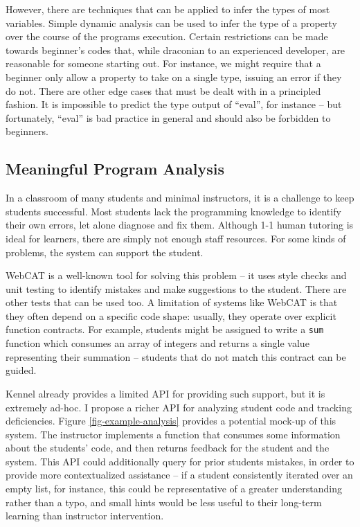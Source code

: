 However, there are techniques that can be applied to infer the types of most variables.
Simple dynamic analysis can be used to infer the type of a property over the course of the programs execution.
Certain restrictions can be made towards beginner's codes that, while draconian to an experienced developer, are reasonable for someone starting out.
For instance, we might require that a beginner only allow a property to take on a single type, issuing an error if they do not.
There are other edge cases that must be dealt with in a principled fashion.
It is impossible to predict the type output of ``eval'', for instance -- but fortunately, ``eval'' is bad practice in general and should also be forbidden to beginners.

\subsection{Meaningful Program Analysis}

In a classroom of many students and minimal instructors, it is a challenge to keep students successful.
Most students lack the programming knowledge to identify their own errors, let alone diagnose and fix them.
Although 1-1 human tutoring is ideal for learners, there are simply not enough staff resources.
For some kinds of problems, the system can support the student.

WebCAT\cite{webcat} is a well-known tool for solving this problem -- it uses style checks and unit testing to identify mistakes and make suggestions to the student.
There are other tests that can be used too.
A limitation of systems like WebCAT is that they often depend on a specific code shape: usually, they operate over explicit function contracts.
For example, students might be assigned to write a \texttt{sum} function which consumes an array of integers and returns a single value representing their summation -- students that do not match this contract can be guided.

Kennel already provides a limited API for providing such support, but it is extremely ad-hoc.
I propose a richer API for analyzing student code and tracking deficiencies.
Figure \ref{fig-example-analysis} provides a potential mock-up of this system.
The instructor implements a function that consumes some information about the students' code, and then returns feedback for the student and the system.
This API could additionally query for prior students mistakes, in order to provide more contextualized assistance -- if a student consistently iterated over an empty list, for instance, this could be representative of a greater understanding rather than a typo, and small hints would be less useful to their long-term learning than instructor intervention.

